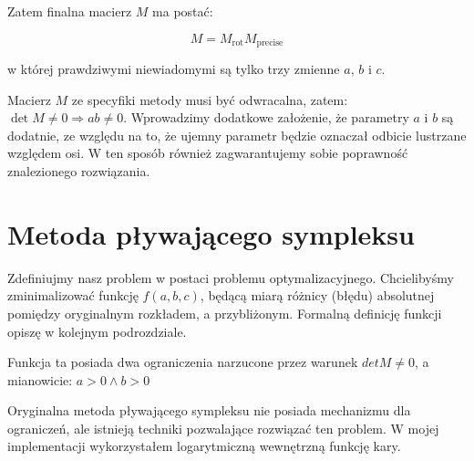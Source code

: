 \documentclass[../main.tex]{subfiles}
\begin{document}
Zatem finalna macierz $M$ ma postać:

$$
M = M_{\text{rot}} M_{\text{precise}}
$$

w której prawdziwymi niewiadomymi są tylko trzy zmienne $a$, $b$ i $c$.

Macierz $M$ ze specyfiki metody musi być odwracalna, zatem:
  $\det M \neq 0 \Rightarrow ab \neq 0$.
Wprowadzimy dodatkowe założenie, że parametry $a$ i $b$ są dodatnie, ze względu
na to, że ujemny parametr będzie oznaczał odbicie lustrzane względem osi.
W ten sposób również zagwarantujemy sobie poprawność znalezionego rozwiązania.

\section{Metoda pływającego sympleksu}

Zdefiniujmy nasz problem w postaci problemu optymalizacyjnego. Chcielibyśmy
zminimalizować funkcję $f(a,b,c)$, będącą miarą różnicy (błędu) absolutnej
pomiędzy oryginalnym rozkładem, a przybliżonym. Formalną definicję funkcji
opiszę w kolejnym podrozdziale.

Funkcja ta posiada dwa ograniczenia narzucone przez warunek $detM \neq 0$,
a mianowicie:
  $a > 0 \wedge b > 0$

Oryginalna metoda pływającego sympleksu nie posiada mechanizmu dla ograniczeń,
ale istnieją techniki pozwalające rozwiązać ten problem. W mojej implementacji
wykorzystałem logarytmiczną wewnętrzną funkcję kary.


\end{document}
